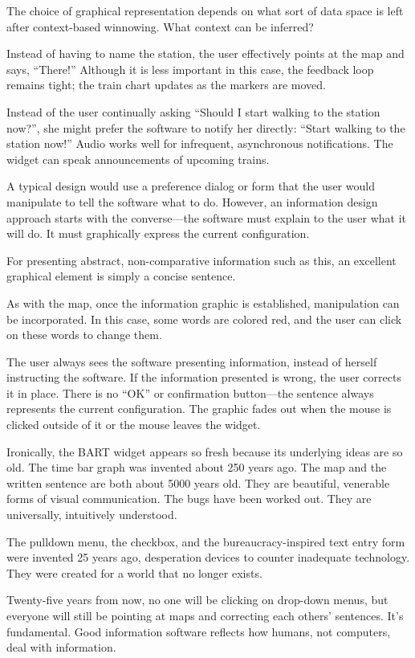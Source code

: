{The choice of graphical representation depends on what sort of data space is left after context-based winnowing. What context can be inferred?

Instead of having to name the station, the user effectively points at the map and says, “There!” Although it is less important in this case, the feedback loop remains tight; the train chart updates as the markers are moved.
 
Instead of the user continually asking “Should I start walking to the station now?”, she might prefer the software to notify her directly: “Start walking to the station now!” Audio works well for infrequent, asynchronous notifications. The widget can speak announcements of upcoming trains. 

A typical design would use a preference dialog or form that the user would manipulate to tell the software what to do. However, an information design approach starts with the converse—the software must explain to the user what it will do. It must graphically express the current configuration.

For presenting abstract, non-comparative information such as this, an excellent graphical element is simply a concise sentence.

As with the map, once the information graphic is established, manipulation can be incorporated. In this case, some words are colored red, and the user can click on these words to change them.

The user always sees the software presenting information, instead of herself instructing the software. If the information presented is wrong, the user corrects it in place. There is no “OK” or confirmation button—the sentence always represents the current configuration. The graphic fades out when the mouse is clicked outside of it or the mouse leaves the widget.

Ironically, the BART widget appears so fresh because its underlying ideas are so old. The time bar graph was invented about 250 years ago. The map and the written sentence are both about 5000 years old. They are beautiful, venerable forms of visual communication. The bugs have been worked out. They are universally, intuitively understood.

The pulldown menu, the checkbox, and the bureaucracy-inspired text entry form were invented 25 years ago, desperation devices to counter inadequate technology. They were created for a world that no longer exists.

Twenty-five years from now, no one will be clicking on drop-down menus, but everyone will still be pointing at maps and correcting each others’ sentences. It’s fundamental. Good information software reflects how humans, not computers, deal with information.

}
